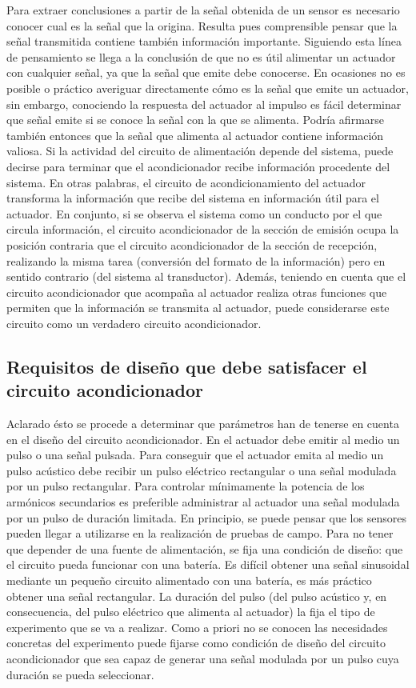 Para extraer conclusiones a partir de la señal obtenida de un sensor es
necesario conocer cual es la señal que la origina. Resulta pues
comprensible pensar que la señal transmitida contiene también información
importante. Siguiendo esta línea de pensamiento se llega a la conclusión de
que no es útil alimentar un actuador con cualquier señal, ya que la señal
que emite debe conocerse. En ocasiones no es posible o práctico averiguar
directamente cómo es la señal que emite un actuador, sin embargo,
conociendo la respuesta del actuador al impulso es fácil determinar que
señal emite si se conoce la señal con la que se alimenta. Podría afirmarse
también entonces que la señal que alimenta al actuador contiene información
valiosa. Si la actividad del circuito de alimentación depende del sistema,
puede decirse para terminar que el acondicionador recibe información
procedente del sistema. En otras palabras, el circuito de acondicionamiento
del actuador transforma la información que recibe del sistema en
información útil para el actuador. En conjunto, si se observa el sistema
como un conducto por el que circula información, el circuito acondicionador
de la sección de emisión ocupa la posición contraria que el circuito
acondicionador de la sección de recepción, realizando la misma tarea
(conversión del formato de la información) pero en sentido contrario (del
sistema al transductor). Además, teniendo en cuenta que el circuito
acondicionador que acompaña al actuador realiza otras funciones que
permiten que la información se transmita al actuador, puede considerarse
este circuito como un verdadero circuito acondicionador.


\subsection[Requisitos de diseño del circuito acondicionador]{Requisitos de
diseño que debe satisfacer el circuito acondicionador}

Aclarado ésto se procede a determinar que parámetros han de tenerse en
cuenta en el diseño del circuito acondicionador. En  el actuador
debe emitir al medio un pulso o una señal pulsada. Para conseguir que el
actuador emita al medio un pulso acústico debe recibir un pulso eléctrico
rectangular o una señal modulada por un pulso rectangular. Para controlar
mínimamente la potencia de los armónicos secundarios es preferible
administrar al actuador una señal modulada por un pulso de duración
limitada. En principio, se puede pensar que los sensores pueden llegar a
utilizarse en la realización de pruebas de campo. Para no tener que
depender de una fuente de alimentación, se fija una condición de diseño:
que el circuito pueda funcionar con una batería. Es difícil obtener una
señal sinusoidal mediante un pequeño circuito alimentado con una batería,
es más práctico obtener una señal rectangular. La duración del pulso (del
pulso acústico y, en consecuencia, del pulso eléctrico que alimenta al
actuador) la fija el tipo de experimento que se va a realizar. Como a
priori no se conocen las necesidades concretas del experimento puede
fijarse como condición de diseño del circuito acondicionador que sea capaz
de generar una señal modulada por un pulso cuya duración se pueda
seleccionar.

